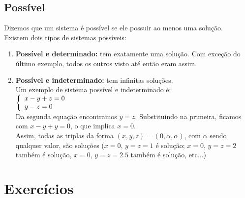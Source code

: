 \documentclass[a4paper,12pt]{article}
\begin{document}
    \subsection{Possível}
    Dizemos que um sistema é possível se ele possuir ao menos uma solução. \\
    Existem dois tipos de sistemas possíveis:
    \begin{enumerate}
    \item \textbf{Possível e determinado:} tem exatamente uma solução. Com exceção do último exemplo, todos os outros visto até então eram assim.
    
    \item \textbf{Possível e indeterminado:} tem infinitas soluções. \\
        Um exemplo de sistema possível e indeterminado é: \\
        $ 
\left\{
\begin{array}{ll}
\displaystyle x - y + z = 0 \\
\displaystyle y - z = 0\\
\end{array}
\right.\\
$
   \\
   Da segunda equação encontramos $y = z$. Substituindo na primeira, ficamos com $x - y + y = 0$, o que implica $x = 0$.\\
   Assim, todas as triplas da forma $(x, y, z) = (0, \alpha, \alpha)$, com $\alpha$ sendo qualquer valor, são soluções ($x = 0$, $y = z = 1$ é solução; $x = 0$, $y = z = 2$ também é solução, $x = 0$, $y = z = 2.5$ também é solução, etc...)
        
    \end{enumerate}
	
\section{Exercícios}
\end{document}
